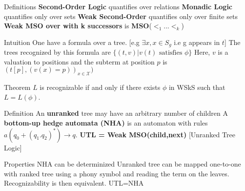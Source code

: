 \documentclass[pdf]{beamer}
\newcommand{\mc}[1]{\mathcal{#1}} %
\begin{document}
\begin{frame}

\begin{block}{Definitions}
\textbf{Second-Order Logic } quantifies over relations \newline
\textbf{Monadic Logic } quantifies only over sets \newline
\textbf{Weak Second-Order } quantifies only over finite sets \newline
\textbf{Weak MSO over with k successors} is \textbf{MSO}($<_1...<_k$) \newline
\end{block}

\begin{exampleblock}{Intuition}
One have a formula over a tree. [e.g $\exists x, x \in S_g$ i.e g appears in $t$]\newline
The trees recognized by this formula are $\{(t,v) \vert v(t) \text{ satisfies } \phi\}$\newline
Here, $v$ is a valuation to positions and the subterm at position $p$ is $(t[p],(v(x)=p))_{x \in \mc{X}})$
\end{exampleblock}

\begin{alertblock}{Theorem}
$L$ is recognizable if and only if there exists $\phi$ in WSkS such that $L=L(\phi)$.\newline
\end{alertblock}

\end{frame}

\begin{frame}

\begin{block}{Definition}
An \textbf{unranked} tree may have an arbitrary number of children	\newline
A \textbf{bottom-up hedge automata (NHA)} is an automaton with rules $a(q_0+(q_1.q_2)^*) \rightarrow q$.
\textbf{UTL = Weak MSO(child,next)} [Unranked Tree Logic]
\end{block}

\begin{alertblock}{Properties}
NHA can be determinized \newline
Unranked tree can be mapped one-to-one with ranked tree using a phony symbol and reading the term on the leaves.\newline
Recognizability is then equivalent. \newline
UTL=NHA
\end{alertblock}

\end{frame}
\end{document}
